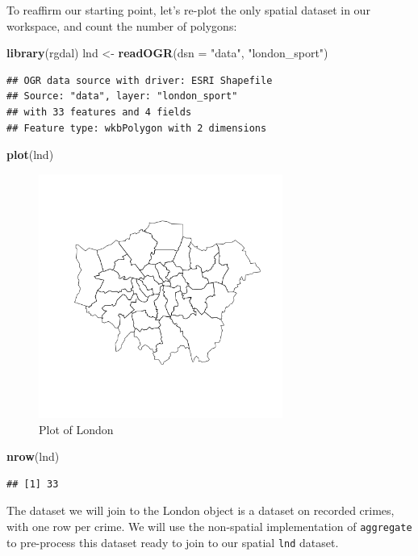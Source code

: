 \documentclass[]{article}
\newenvironment{Shaded}{}{}
\newcommand{\KeywordTok}[1]{\textcolor[rgb]{0.00,0.44,0.13}{\textbf{{#1}}}}
\newcommand{\DataTypeTok}[1]{\textcolor[rgb]{0.56,0.13,0.00}{{#1}}}
\newcommand{\StringTok}[1]{\textcolor[rgb]{0.25,0.44,0.63}{{#1}}}
\newcommand{\NormalTok}[1]{{#1}}
\let\Oldincludegraphics\includegraphics
\renewcommand{\includegraphics}[1]{\Oldincludegraphics[width=8cm]{#1}}
\begin{document}
To reaffirm our starting point, let's re-plot the only spatial dataset
in our workspace, and count the number of polygons:

\begin{Shaded}
\begin{Highlighting}[]
\KeywordTok{library}\NormalTok{(rgdal)}
\NormalTok{lnd <- }\KeywordTok{readOGR}\NormalTok{(}\DataTypeTok{dsn =} \StringTok{"data"}\NormalTok{, }\StringTok{"london_sport"}\NormalTok{)}
\end{Highlighting}
\end{Shaded}
\begin{verbatim}
## OGR data source with driver: ESRI Shapefile 
## Source: "data", layer: "london_sport"
## with 33 features and 4 fields
## Feature type: wkbPolygon with 2 dimensions
\end{verbatim}
\begin{Shaded}
\begin{Highlighting}[]
\KeywordTok{plot}\NormalTok{(lnd)}
\end{Highlighting}
\end{Shaded}
\begin{figure}[htbp]
\centering
\includegraphics{figure/Plot_of_London.png}
\caption{Plot of London}
\end{figure}

\begin{Shaded}
\begin{Highlighting}[]
\KeywordTok{nrow}\NormalTok{(lnd)}
\end{Highlighting}
\end{Shaded}
\begin{verbatim}
## [1] 33
\end{verbatim}
The dataset we will join to the London object is a dataset on recorded
crimes, with one row per crime. We will use the non-spatial
implementation of \texttt{aggregate} to pre-process this dataset ready
to join to our spatial \texttt{lnd} dataset.
\end{document}
